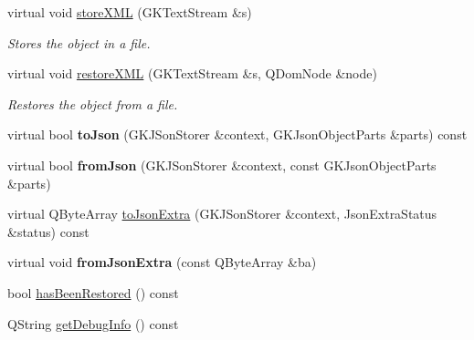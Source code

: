 \begin{DoxyCompactItemize}
\item 
virtual void \hyperlink{classGKObject_a6bc9c5a19cc8d195d478857e158fba16}{store\+X\+ML} (G\+K\+Text\+Stream \&s)\hypertarget{classGKObject_a6bc9c5a19cc8d195d478857e158fba16}{}\label{classGKObject_a6bc9c5a19cc8d195d478857e158fba16}

\begin{DoxyCompactList}\small\item\em Stores the object in a file. \end{DoxyCompactList}\item 
virtual void \hyperlink{classGKObject_a6eedc1a08e034b517f71f52b2beacee7}{restore\+X\+ML} (G\+K\+Text\+Stream \&s, Q\+Dom\+Node \&node)\hypertarget{classGKObject_a6eedc1a08e034b517f71f52b2beacee7}{}\label{classGKObject_a6eedc1a08e034b517f71f52b2beacee7}

\begin{DoxyCompactList}\small\item\em Restores the object from a file. \end{DoxyCompactList}\item 
virtual bool {\bfseries to\+Json} (G\+K\+J\+Son\+Storer \&context, G\+K\+Json\+Object\+Parts \&parts) const \hypertarget{classGKObject_a94d232d3f74b29874aa361eaadc67330}{}\label{classGKObject_a94d232d3f74b29874aa361eaadc67330}

\item 
virtual bool {\bfseries from\+Json} (G\+K\+J\+Son\+Storer \&context, const G\+K\+Json\+Object\+Parts \&parts)\hypertarget{classGKObject_aa2863af987931e0fbcb693084e30eb9a}{}\label{classGKObject_aa2863af987931e0fbcb693084e30eb9a}

\item 
virtual Q\+Byte\+Array \hyperlink{classGKObject_a1087e83311b156c33d626656837c9834}{to\+Json\+Extra} (G\+K\+J\+Son\+Storer \&context, Json\+Extra\+Status \&status) const 
\item 
virtual void {\bfseries from\+Json\+Extra} (const Q\+Byte\+Array \&ba)\hypertarget{classGKObject_a47d1b431f778bad0a103422789b790ad}{}\label{classGKObject_a47d1b431f778bad0a103422789b790ad}

\item 
bool \hyperlink{classGKObject_aec1d94b913a9e94f74c5c345e08fbf6a}{has\+Been\+Restored} () const 
\item 
Q\+String \hyperlink{classGKObject_ac09026de24f573dc93daddf57da844d1}{get\+Debug\+Info} () const 
\end{DoxyCompactItemize}
